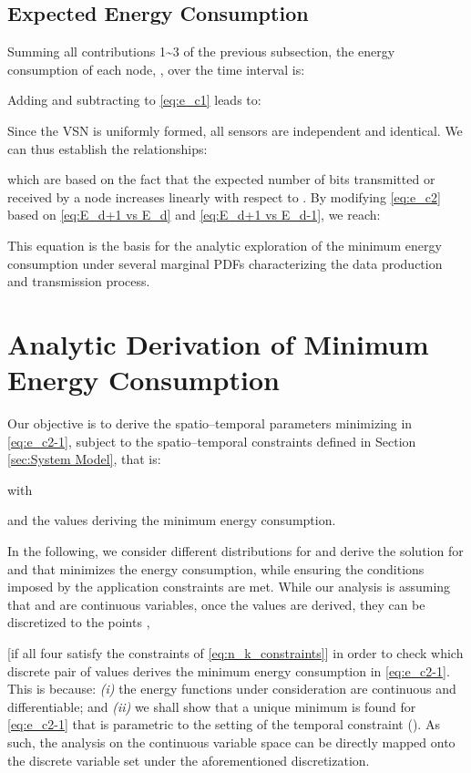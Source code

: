 \documentclass[twocolumn,english]{IEEEtran}
\theoremstyle{plain}
\theoremstyle{definition}
\begin{document}
\subsection{Expected Energy Consumption}

Summing all contributions 1\textasciitilde{}3 of the previous subsection,
the energy consumption of each node, , over the time
interval  is:


Adding and subtracting 
to \eqref{eq:e_c1} leads to:


Since the VSN is uniformly formed, all sensors are independent and
identical. We can thus establish the relationships:





which are based on the fact that the expected number of bits transmitted
or received by a node increases linearly with respect to . By
modifying \eqref{eq:e_c2} based on \eqref{eq:E_d+1 vs E_d} and \eqref{eq:E_d+1 vs E_d-1},
we reach:


This equation is the basis for the analytic exploration of the minimum
energy consumption under several marginal PDFs characterizing the
data production and transmission process.


\section{Analytic Derivation of Minimum Energy Consumption}

\label{sec:min_energy_analysis}

Our objective is to derive the spatio--temporal parameters minimizing
 in \eqref{eq:e_c2-1}, subject to
the spatio--temporal constraints defined in Section \ref{sec:System Model},
that is:





with


and  the values deriving the
minimum energy consumption.

In the following, we consider different distributions for 
and derive the solution for  and  that minimizes the energy
consumption, while ensuring the conditions imposed by the application
constraints are met. While our analysis is assuming that  and
 are continuous variables, once the 
values are derived, they can be discretized to the points ,



{[}if all four satisfy the constraints of \eqref{eq:n_k_constraints}{]}
in order to check which discrete pair of values derives the minimum
energy consumption in \eqref{eq:e_c2-1}. This is because: \emph{(i)}
the energy functions under consideration are continuous and differentiable;
and \emph{(ii)} we shall show that a unique minimum is found for \eqref{eq:e_c2-1}
that is parametric to the setting of the temporal constraint ().
As such, the analysis on the continuous variable space can be directly
mapped onto the discrete variable set under the aforementioned discretization.
\end{document}
